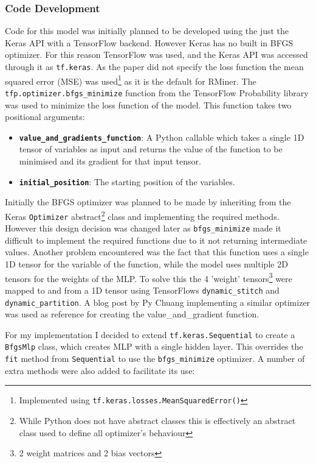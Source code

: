 \documentclass[12pt,a4paper,titlepage,twoside]{report}
\begin{document}
\subsubsection*{Code Development}
	Code for this model was initially planned to be developed using the just the Keras API with a TensorFlow backend. However Keras has no built in BFGS optimizer. For this reason TensorFlow was used, and the Keras API was accessed through it as \texttt{tf.keras}. As the paper did not specify the loss function the mean squared error (MSE) was used\footnote{Implemented using \texttt{tf.keras.losses.MeanSquaredError()}} as it is the default for RMiner. The \texttt{tfp.optimizer.bfgs_minimize} function from the TensorFlow Probability library was used to minimize the loss function of the model. This function takes two positional arguments:
	\begin{itemize}
	\item \textbf{\texttt{value_and_gradients_function}}: A Python callable which takes a single 1D tensor of variables as input and returns the value of the function to be minimised and its gradient for that input tensor.
	\item \textbf{\texttt{initial_position}}: The starting position of the variables.
	\end{itemize}
	Initially the BFGS optimizer was planned to be made by inheriting from the Keras \texttt{Optimizer} abstract\footnote{While Python does not have abstract classes this is effectively an abstract class used to define all optimizer's behaviour} class and implementing the required methods. However this design decision was changed later as \texttt{bfgs_minimize} made it difficult to implement the required functions due to it not returning intermediate values. Another problem encountered was the fact that this function uses a single 1D tensor for the variable of the function, while the model uses multiple 2D tensors for the weights of the MLP. To solve this the 4 'weight' tensors\footnote{2 weight matrices  and 2 bias vectors} were mapped to and from a 1D tensor using TensorFlows \texttt{dynamic_stitch} and \texttt{dynamic_partition}. A blog post by Py Chuang implementing a similar optimizer was used as reference\cite{pychoa-optimizer} for creating the value_and_gradient function. \par
	For my implementation I decided to extend \texttt{tf.keras.Sequential} to create a \texttt{BfgsMlp} class, which creates MLP with a single hidden layer. This overrides the \texttt{fit} method from \texttt{Sequential} to use the \texttt{bfgs_minimize} optimizer. A number of extra methods were also added to facilitate its use:
\end{document}
